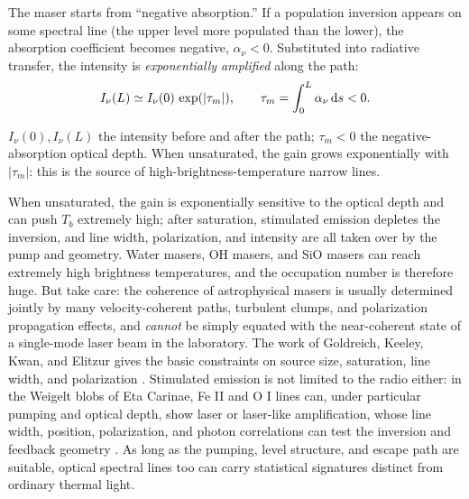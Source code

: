 The maser starts from ``negative absorption.'' If a population inversion appears on some spectral line (the upper level more populated than the lower), the absorption coefficient becomes negative, \(\alpha_\nu<0\). Substituted into radiative transfer, the intensity is \emph{exponentially amplified} along the path:
\begin{equation}
  I_\nu(L)\simeq I_\nu(0)\,\exp(|\tau_m|),
  \qquad
  \tau_m=\int_0^L\alpha_\nu\,{\rm d}s<0 .
  \label{eq:e16-maser-gain}
\end{equation}
\begin{formulaexplain}
\(I_\nu(0),I_\nu(L)\) the intensity before and after the path; \(\tau_m<0\) the negative-absorption optical depth. When unsaturated, the gain grows exponentially with \(|\tau_m|\): this is the source of high-brightness-temperature narrow lines.
\end{formulaexplain}
When unsaturated, the gain is exponentially sensitive to the optical depth and can push \(T_b\) extremely high; after saturation, stimulated emission depletes the inversion, and line width, polarization, and intensity are all taken over by the pump and geometry. Water masers, OH masers, and SiO masers can reach extremely high brightness temperatures, and the occupation number is therefore huge. But take care: the coherence of astrophysical masers is usually determined jointly by many velocity-coherent paths, turbulent clumps, and polarization propagation effects, and \emph{cannot} be simply equated with the near-coherent state of a single-mode laser beam in the laboratory. The work of Goldreich, Keeley, Kwan, and Elitzur gives the basic constraints on source size, saturation, line width, and polarization \citep{1972ApJ...174..517G,1973ApJ...179..111G,1974ApJ...190...27G,1982RvMP...54.1225E,1992ARA&A..30...75E}. Stimulated emission is not limited to the radio either: in the Weigelt blobs of Eta Carinae, Fe II and O I lines can, under particular pumping and optical depth, show laser or laser-like amplification, whose line width, position, polarization, and photon correlations can test the inversion and feedback geometry \citep{2004A&A...428..497J,2005NewA...10..361J,2008AIPC..984..216D}. As long as the pumping, level structure, and escape path are suitable, optical spectral lines too can carry statistical signatures distinct from ordinary thermal light.


